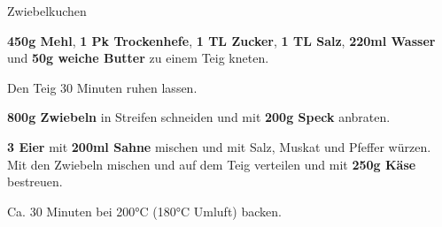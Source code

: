 \newpage

\begin{recipe}[]{Zwiebelkuchen} %


\step
\textbf{450g Mehl}, \textbf{1 Pk Trockenhefe}, \textbf{1 TL Zucker}, \textbf{1 TL Salz}, \textbf{220ml Wasser} und \textbf{50g weiche Butter} zu einem Teig kneten.

\step
Den Teig 30 Minuten ruhen lassen. 

\step
\textbf{800g Zwiebeln} in Streifen schneiden und mit \textbf{200g Speck} anbraten.

\step
\textbf{3 Eier} mit \textbf{200ml Sahne} mischen und mit Salz, Muskat und Pfeffer würzen. Mit den Zwiebeln mischen und auf dem Teig verteilen und mit \textbf{250g Käse} bestreuen.

\step 
Ca. 30 Minuten bei 200°C (180°C Umluft) backen.

\end{recipe}